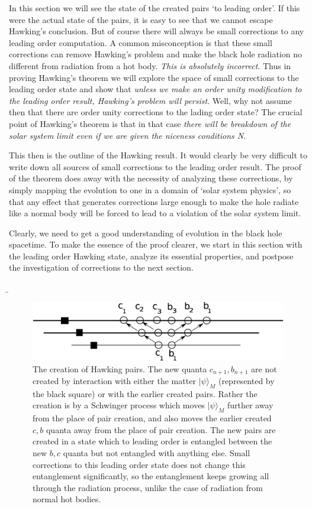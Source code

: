 \documentclass[12pt]{article}
\begin{document}
In this section we will see the state of the created pairs `to leading order'. If this were the actual state of the pairs, it is easy to see that we cannot escape Hawking's conclusion. But of course there will always be small corrections to any leading order computation. A common misconception is that these small corrections can remove Hawking's problem and make the black hole radiation no different from radiation from a hot body. {\it This is absolutely incorrect}. Thus  in proving  Hawking's theorem we will explore the space of small corrections to the leading order state and show that {\it unless we make an order unity modification to the leading order result, Hawking's problem will persist}. Well, why not assume then that there are order unity corrections to the lading order state? The crucial point of Hawking's theorem is that in that case {\it there will be breakdown of the solar system limit even if we are given the niceness conditions N}. 

This then is the outline of the Hawking result. It would clearly be very difficult to write down all sources of small corrections to the leading order result. The proof of the theorem does away with the necessity of analyzing these corrections, by simply  mapping the  evolution to one in a domain of `solar system physics', so that any effect that generates corrections large enough to make the hole radiate like a normal body will be forced to lead to a violation of the solar system limit. 

Clearly, we need to get a good understanding of evolution in the black hole spacetime. To make the essence of the proof clearer, we start in this section with the leading order Hawking state, analyze its essential properties, and postpose the investigation of corrections to the next section. 



\b
\begin{figure}[htbp]
\begin{center}
\includegraphics[scale=.25]{ffour.eps}
\caption{{The creation of Hawking pairs. The new quanta $c_{n+1}, b_{n+1}$ are not created by interaction with either the matter $|\psi\rangle_M$ (represented by the black square) or with the earlier created pairs. Rather the creation is by a Schwinger process which moves $|\psi\rangle_M$ further away from the place of pair creation, and also moves the earlier created $c, b$ quanta away from the place of pair creation. The new pairs are created in a state which to leading order is entangled between the new $b,c$ quanta but not entangled with anything else. Small corrections to this leading order state does not change this entanglement significantly, so the entanglement keeps growing all through the radiation process, unlike the case of radiation from normal hot bodies.}}
\label{ffour}
\end{center}
\end{figure}
\end{document}
